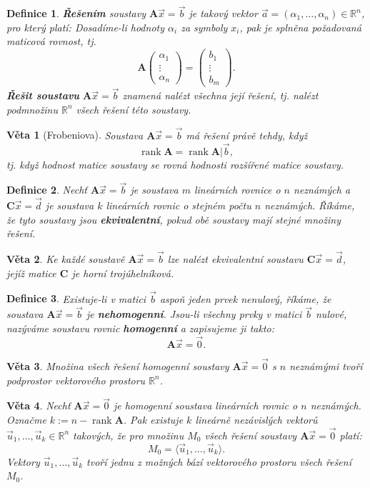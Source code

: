 \documentclass{article}
\newtheorem{df}{Definice}
\newtheorem{veta}{Věta}
\newcommand{\0}{\vec{0}}
\newcommand{\A}{\mat A}
\newcommand{\lo}[1]{\langle #1\rangle}
\newcommand{\mat}[1]{\mathbf{#1}}
\newcommand{\R}{\mathbb R}
\newcommand{\rank}{\operatorname{rank}}
\newcommand{\uu}{\vec{u}}
\newcommand{\xx}{\vec{x}}
\begin{document}
  
\begin{df}
{\bf Řešením} soustavy $\A\xx=\vec b$ je takový vektor $\vec a=(\alpha_1,\ldots,\alpha_n)\in\R^n$, pro který platí: Dosadíme-li hodnoty $\alpha_i$ za symboly $x_i$, pak je splněna požadovaná maticová rovnost, tj.
$$ \A \begin{pmatrix}\alpha_1\\\vdots\\\alpha_n\end{pmatrix}=\begin{pmatrix}b_1\\\vdots\\b_m\end{pmatrix}. $$
{\bf Řešit soustavu} $\A\xx=\vec b$ znamená nalézt všechna její řešení, tj. nalézt podmnožinu $\R^n$ všech řešení této soustavy.
\end{df}

\begin{veta}[Frobeniova]
Soustava $\A\xx=\vec b$ má řešení právě tehdy, když
$$ \rank{\A}=\rank{\A|\vec b}, $$
tj. když hodnost matice soustavy se rovná hodnosti rozšířené matice soustavy.
\end{veta}

  
\begin{df}
Nechť $\A\xx=\vec b$ je soustava $m$ lineárních rovnice o $n$ neznámých a $\mat C\xx=\vec d$ je soustava $k$ lineárních rovnic o stejném počtu $n$ neznámých.
Říkáme, že tyto soustavy jsou {\bf ekvivalentní}, pokud obě soustavy mají stejné množiny řešení.
\end{df}

\begin{veta}
Ke každé soustavě $\A\xx=\vec b$ lze nalézt ekvivalentní soustavu $\mat C\xx=\vec d$, jejíž matice $\mat C$ je horní trojúhelníková.
\end{veta}
  
\begin{df}
Existuje-li v matici $\vec b$ aspoň jeden prvek nenulový, říkáme, že soustava $\A\xx=\vec b$ je {\bf nehomogenní}.
Jsou-li všechny prvky v matici $\vec b$ nulové, nazýváme soustavu rovnic {\bf homogenní} a zapisujeme ji takto:
$$ \A\xx=\0. $$
\end{df}

\begin{veta}
Množina všech řešení homogenní soustavy $\A\xx=\0$ s $n$ neznámými tvoří podprostor vektorového prostoru $\R^n$.
\end{veta}
  
\begin{veta}
Nechť $\A\xx=\0$ je homogenní soustava lineárních rovnic o $n$ neznámých.
Označme $k:=n-\rank\A$.
Pak existuje $k$ lineárně nezávislých vektorů $\uu_1,\ldots,\uu_k\in\R^n$ takových, že pro množinu $M_0$ všech řešení soustavy $\A\xx=\0$ platí:
$$ M_0=\lo{\uu_1,\ldots,\uu_k}. $$
Vektory $\uu_1,\ldots,\uu_k$ tvoří jednu z možných bází vektorového prostoru všech řešení $M_0$.
\end{veta}
\end{document}
